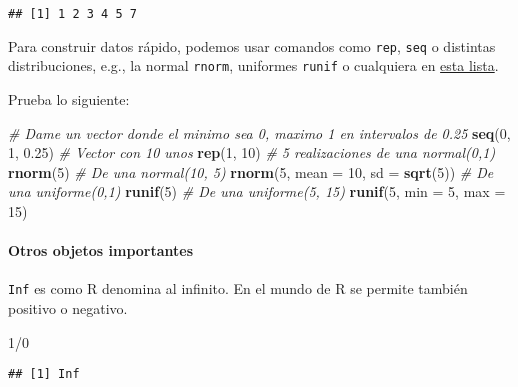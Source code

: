 \documentclass[]{article}
\newenvironment{Shaded}{\begin{snugshade}}{\end{snugshade}}
\newcommand{\KeywordTok}[1]{\textcolor[rgb]{0.13,0.29,0.53}{\textbf{{#1}}}}
\newcommand{\DataTypeTok}[1]{\textcolor[rgb]{0.13,0.29,0.53}{{#1}}}
\newcommand{\DecValTok}[1]{\textcolor[rgb]{0.00,0.00,0.81}{{#1}}}
\newcommand{\FloatTok}[1]{\textcolor[rgb]{0.00,0.00,0.81}{{#1}}}
\newcommand{\CommentTok}[1]{\textcolor[rgb]{0.56,0.35,0.01}{\textit{{#1}}}}
\newcommand{\NormalTok}[1]{{#1}}
\begin{document}
\begin{verbatim}
## [1] 1 2 3 4 5 7
\end{verbatim}

Para construir datos rápido, podemos usar comandos como \texttt{rep},
\texttt{seq} o distintas distribuciones, e.g., la normal \texttt{rnorm},
uniformes \texttt{runif} o cualquiera en
\href{https://stat.ethz.ch/R-manual/R-devel/library/stats/html/Distributions.html}{esta
lista}.

Prueba lo siguiente:

\begin{Shaded}
\begin{Highlighting}[]
\CommentTok{# Dame un vector donde el minimo sea 0, maximo 1 en intervalos de 0.25}
\KeywordTok{seq}\NormalTok{(}\DecValTok{0}\NormalTok{, }\DecValTok{1}\NormalTok{, }\FloatTok{0.25}\NormalTok{)}
\CommentTok{# Vector con 10 unos}
\KeywordTok{rep}\NormalTok{(}\DecValTok{1}\NormalTok{, }\DecValTok{10}\NormalTok{)}
\CommentTok{# 5 realizaciones de una normal(0,1)}
\KeywordTok{rnorm}\NormalTok{(}\DecValTok{5}\NormalTok{)}
\CommentTok{# De una normal(10, 5)}
\KeywordTok{rnorm}\NormalTok{(}\DecValTok{5}\NormalTok{, }\DataTypeTok{mean =} \DecValTok{10}\NormalTok{, }\DataTypeTok{sd =} \KeywordTok{sqrt}\NormalTok{(}\DecValTok{5}\NormalTok{))}
\CommentTok{# De una uniforme(0,1)}
\KeywordTok{runif}\NormalTok{(}\DecValTok{5}\NormalTok{)}
\CommentTok{# De una uniforme(5, 15)}
\KeywordTok{runif}\NormalTok{(}\DecValTok{5}\NormalTok{, }\DataTypeTok{min =} \DecValTok{5}\NormalTok{, }\DataTypeTok{max =} \DecValTok{15}\NormalTok{)}
\end{Highlighting}
\end{Shaded}

\paragraph{Otros objetos importantes}\label{otros-objetos-importantes}

\texttt{Inf} es como R denomina al infinito. En el mundo de R se permite
también positivo o negativo.

\begin{Shaded}
\begin{Highlighting}[]
\DecValTok{1}\NormalTok{/}\DecValTok{0}
\end{Highlighting}
\end{Shaded}

\begin{verbatim}
## [1] Inf
\end{verbatim}
\end{document}
